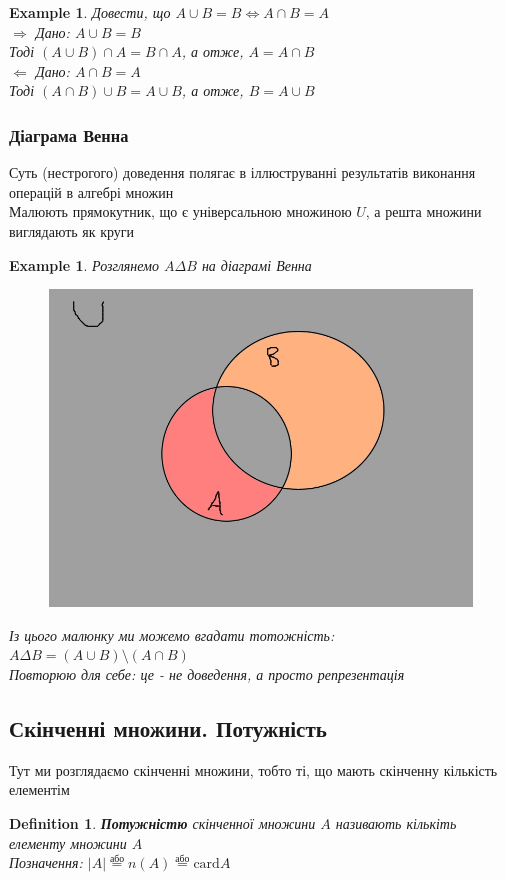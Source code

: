 \documentclass[a4paper, 14pt]{extarticle}
\def\rightproof{$\boxed{\Rightarrow}$ }
\def\leftproof{$\boxed{\Leftarrow}$ }
\theoremstyle{theoremdd}
\theoremstyle{theoremdd}
\newtheorem{definition}[theorem]{Definition}
\theoremstyle{theoremdd}
\theoremstyle{theoremdd}
\newtheorem{example}[theorem]{Example}
\theoremstyle{theoremdd}
\theoremstyle{theoremdd}
\theoremstyle{theoremdd}
\theoremstyle{theoremdd}
\begin{document}
\begin{example}
Довести, що $A \cup B = B \iff A \cap B = A$\\
\rightproof Дано: $A \cup B = B$\\
Тоді $(A \cup B) \cap A = B \cap A$, а отже, $A = A \cap B$
\bigskip \\
\leftproof Дано: $A \cap B = A$\\
Тоді $(A \cap B) \cup B = A \cup B$, а отже, $B = A \cup B$
\end{example}

\subsubsection{Діаграма Венна}
Суть (нестрогого) доведення полягає в іллюструванні результатів виконання операцій в алгебрі множин\\
Малюють прямокутник, що є універсальною множиною $U$, а решта множини виглядають як круги
\begin{example}
Розглянемо $A \Delta B$ на діаграмі Венна
\begin{figure}[H]
\centering
\includegraphics[scale=0.2]{venna.jpg}
\end{figure}
Із цього малюнку ми можемо вгадати тотожність:\\
$A \Delta B = (A \cup B) \setminus (A \cap B)$\\
Повторюю для себе: це - не доведення, а просто репрезентація
\end{example}

\subsection{Скінченні множини. Потужність}
Тут ми розглядаємо скінченні множини, тобто ті, що мають скінченну кількість елементім
\begin{definition}
\textbf{Потужністю} скінченної множини $A$ називають кількіть елементу множини $A$\\
Позначення: $|A| \overset{\text{або}}{=} n(A) \overset{\text{або}}{=} \text{card} A$
\end{definition}
\end{document}
